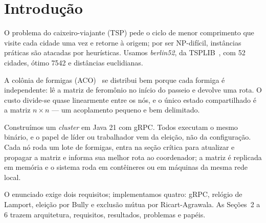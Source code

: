 \section{Introdu\c{c}\~ao}

O problema do caixeiro-viajante (TSP) pede o ciclo de menor comprimento que visite cada cidade uma
vez e retorne à origem; por ser NP-difícil, instâncias práticas são atacadas por heurísticas.
Usamos \textit{berlin52}, da TSPLIB~\cite{reinelt91}, com 52 cidades, ótimo 7542 e distâncias
euclidianas.

A colônia de formigas (ACO)~\cite{dorigo97} se distribui bem porque cada formiga é independente: lê
a matriz de feromônio no início do passeio e devolve uma rota. O custo divide-se quase linearmente
entre os nós, e o único estado compartilhado é a matriz $n \times n$ --- um acoplamento pequeno e
bem delimitado.

Construímos um \textit{cluster} em Java 21 com gRPC. Todos executam o mesmo binário, e o papel de
líder ou trabalhador vem da eleição, não da configuração. Cada nó roda um lote de formigas, entra
na seção crítica para atualizar e propagar a matriz e informa sua melhor rota ao coordenador; a
matriz é replicada em memória e o sistema roda em contêineres ou em máquinas da mesma rede local.

O enunciado exige dois requisitos; implementamos quatro: gRPC, relógio de Lamport, eleição por
Bully e exclusão mútua por Ricart-Agrawala. As Seções~2 a 6 trazem arquitetura, requisitos,
resultados, problemas e papéis.

